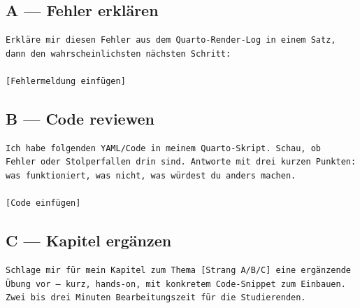 \documentclass[
  ngerman,
  a4paper,
  DIV=11]{scrreprt}
\begin{document}
\subsection{A --- Fehler erklären}\label{a-fehler-erkluxe4ren}

\begin{verbatim}
Erkläre mir diesen Fehler aus dem Quarto-Render-Log in einem Satz,
dann den wahrscheinlichsten nächsten Schritt:

[Fehlermeldung einfügen]
\end{verbatim}

\subsection{B --- Code reviewen}\label{b-code-reviewen}

\begin{verbatim}
Ich habe folgenden YAML/Code in meinem Quarto-Skript. Schau, ob
Fehler oder Stolperfallen drin sind. Antworte mit drei kurzen Punkten:
was funktioniert, was nicht, was würdest du anders machen.

[Code einfügen]
\end{verbatim}

\subsection{C --- Kapitel ergänzen}\label{c-kapitel-erguxe4nzen}

\begin{verbatim}
Schlage mir für mein Kapitel zum Thema [Strang A/B/C] eine ergänzende
Übung vor — kurz, hands-on, mit konkretem Code-Snippet zum Einbauen.
Zwei bis drei Minuten Bearbeitungszeit für die Studierenden.
\end{verbatim}
\end{document}
